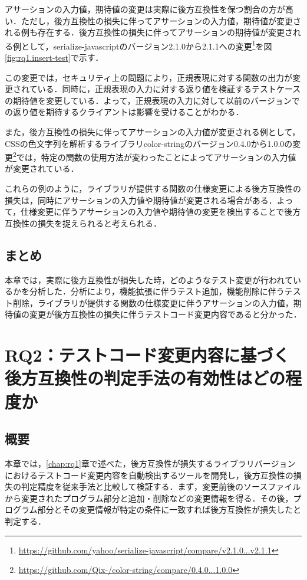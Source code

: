 \documentclass[11pt,dvipdfmx]{jreport}
\begin{document}
アサーションの入力値，期待値の変更は実際に後方互換性を保つ割合の方が高い．ただし，後方互換性の損失に伴ってアサーションの入力値，期待値が変更される例も存在する．後方互換性の損失に伴ってアサーションの期待値が変更される例として，serialize-javascriptのバージョン2.1.0から2.1.1への変更\footnote{\url{https://github.com/yahoo/serialize-javascript/compare/v2.1.0...v2.1.1}}を図\ref{fig:rq1.insert-test}で示す．

この変更では，セキュリティ上の問題により，正規表現に対する関数の出力が変更されている．同時に，正規表現の入力に対する返り値を検証するテストケースの期待値を変更している．よって，正規表現の入力に対して以前のバージョンでの返り値を期待するクライアントは影響を受けることがわかる．

また，後方互換性の損失に伴ってアサーションの入力値が変更される例として，CSSの色文字列を解析するライブラリcolor-stringのバージョン0.4.0から1.0.0の変更\footnote{\url{https://github.com/Qix-/color-string/compare/0.4.0...1.0.0}}では，特定の関数の使用方法が変わったことによってアサーションの入力値が変更されている．

これらの例のように，ライブラリが提供する関数の仕様変更による後方互換性の損失は，同時にアサーションの入力値や期待値が変更される場合がある．よって，仕様変更に伴うアサーションの入力値や期待値の変更を検出することで後方互換性の損失を捉えられると考えられる．

\section{まとめ}
本章では，実際に後方互換性が損失した時，どのようなテスト変更が行われているかを分析した．分析により，機能拡張に伴うテスト追加，機能削除に伴うテスト削除，ライブラリが提供する関数の仕様変更に伴うアサーションの入力値，期待値の変更が後方互換性の損失に伴うテストコード変更内容であると分かった．

\chapter{RQ2：テストコード変更内容に基づく後方互換性の判定手法の有効性はどの程度か}\label{chap:rq2}

\section{概要}
本章では，\ref{chap:rq1}章で述べた，後方互換性が損失するライブラリバージョンにおけるテストコード変更内容を自動検出するツールを開発し，後方互換性の損失の判定精度を従来手法と比較して検証する．まず，変更前後のソースファイルから変更されたプログラム部分と追加・削除などの変更情報を得る．その後，プログラム部分とその変更情報が特定の条件に一致すれば後方互換性が損失したと判定する．
\end{document}
